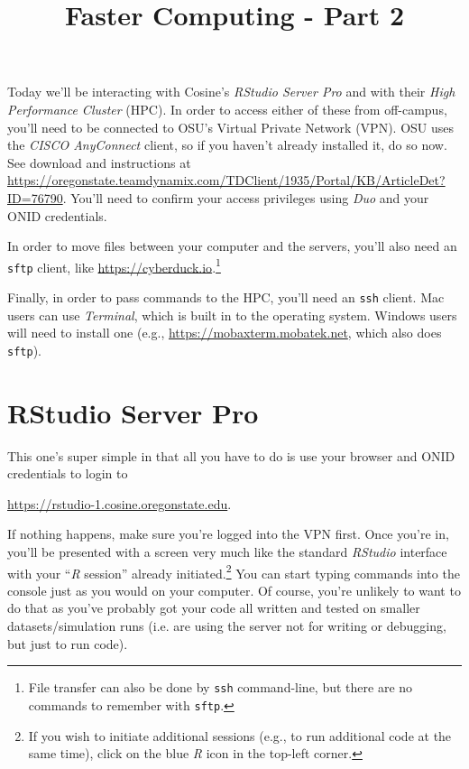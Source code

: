 \documentclass[12pt,letterpaper]{article}
\title{Faster Computing - Part 2}
\author{}
\begin{document}
\maketitle
\tableofcontents

\clearpage

Today we'll be interacting with Cosine's \emph{RStudio Server Pro} and with their \emph{High
Performance Cluster} (HPC).
In order to access either of these from off-campus, you'll need to be connected to OSU's Virtual Private
Network (VPN).
OSU uses the \emph{CISCO AnyConnect} client, so if you haven't already installed it, do so now.
See download and instructions at
\url{https://oregonstate.teamdynamix.com/TDClient/1935/Portal/KB/ArticleDet?ID=76790}.
You'll need to confirm your access privileges using \emph{Duo} and your ONID credentials.

In order to move files between your computer and the servers, you'll
also need an \texttt{sftp} client, like \url{https://cyberduck.io}.\footnote{File transfer can also be done by
\texttt{ssh} command-line, but there are no commands to remember with \texttt{sftp}.}

Finally, in order to pass commands to the HPC, you'll need an \texttt{ssh} client.
Mac users can use \emph{Terminal}, which is built in to the operating system.
Windows users will need to install one (e.g., \url{https://mobaxterm.mobatek.net}, which also does
\texttt{sftp}).



\section{RStudio Server Pro}

This one's super simple in that all you have to do is use your browser and ONID credentials to login
to

\url{https://rstudio-1.cosine.oregonstate.edu}.

\noindent
If nothing happens, make sure you're logged into the VPN first.
Once you're in, you'll be presented with a screen very much like the standard \emph{RStudio} interface
with your ``\emph{R} session'' already initiated.\footnote{If you wish to initiate additional sessions (e.g.,
to run additional code at the same time), click on the blue \emph{R} icon in the top-left corner.}
You can start typing commands into the console just as you would on your computer.
Of course, you're unlikely to want to do that as you've probably got your code all written and tested on
smaller datasets/simulation runs (i.e. are using the server not for writing or debugging, but just to run
code).
\end{document}
